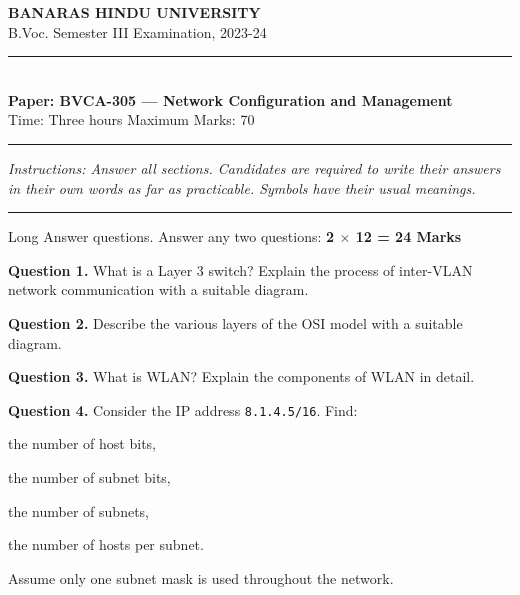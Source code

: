 \documentclass[11pt,a4paper]{article}
\begin{document}
\begin{center}
  {\large\bfseries BANARAS HINDU UNIVERSITY}\\[2pt]
  {
\normalsize B.Voc. Semester III Examination, 2023-24}\\[6pt]
  \rule{0.8\linewidth}{0.5pt}\\[6pt]
  {\large\bfseries Paper: BVCA-305 --- Network Configuration and Management}\\[4pt]
  {
\normalsize Time: Three hours \hfill Maximum Marks: 70}
\end{center}

\rule{\linewidth}{0.4pt}

\smallskip



\noindent   \textit{Instructions: Answer all sections. Candidates are required to write their answers in their own words as far as practicable. Symbols have their usual meanings.}

\bigskip




\rule{\linewidth}{0.4pt}\smallskip

Long Answer questions. Answer any two questions: \hfill   \textbf{2 $ \times$ 12 = 24 Marks}

\medskip



\noindent   \textbf{Question 1.} What is a Layer 3 switch? Explain the process of inter-VLAN network communication with a suitable diagram.

\medskip



\noindent   \textbf{Question 2.} Describe the various layers of the OSI model with a suitable diagram.

\medskip



\noindent   \textbf{Question 3.} What is WLAN? Explain the components of WLAN in detail.

\medskip



\noindent   \textbf{Question 4.} Consider the IP address   \texttt{8.1.4.5/16}. Find:

\begin{parts}
  \item the number of host bits,
  \item the number of subnet bits,
  \item the number of subnets,
  \item the number of hosts per subnet.
\end{parts}
Assume only one subnet mask is used throughout the network.
\end{document}
